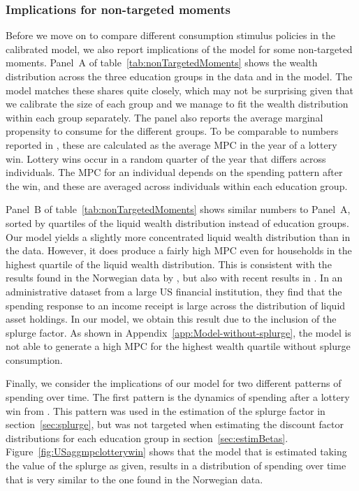 \documentclass[\PathToRoot/\ProjectName]{subfiles}
\begin{document}
\subsubsection{Implications for non-targeted moments}\whenintegrated{\label{non-targeted-moments}}
\whenintegrated{\label{sec:nonTargetedMoments}}

Before we move on to compare different consumption stimulus policies in the calibrated model, we also report implications of the model for some non-targeted moments.
Panel~A of table~\ref{tab:nonTargetedMoments} shows the wealth distribution across the three education groups in the data and in the model.
The model matches these shares quite closely, which may not be surprising given that we calibrate the size of each group and we manage to fit the wealth distribution within each group separately.
The panel also reports the average marginal propensity to consume for the different groups.
To be comparable to numbers reported in \cite{fagereng-mpc-2021}, these are calculated as the average MPC in the year of a lottery win.
Lottery wins occur in a random quarter of the year that differs across individuals.
The MPC for an individual depends on the spending pattern after the win, and these are averaged across individuals within each education group.

Panel~B of table~\ref{tab:nonTargetedMoments} shows similar numbers to Panel~A, sorted by quartiles of the liquid wealth distribution instead of education groups.
Our model yields a slightly more concentrated liquid wealth distribution than in the data.
However, it does produce a fairly high MPC even for households in the highest quartile of the liquid wealth distribution.
This is consistent with the results found in the Norwegian data by \cite{fagereng-mpc-2021}, but also with recent results in \cite{graham2024mental}.
In an administrative dataset from a large US financial institution, they find that the spending response to an income receipt is large across the distribution of liquid asset holdings.
In our model, we obtain this result due to the inclusion of the splurge factor.
As shown in Appendix~\ref{app:Model-without-splurge}, the model is not able to generate a high MPC for the highest wealth quartile without splurge consumption.


Finally, we consider the implications of our model for two different patterns of spending over time.
The first pattern is the dynamics of spending after a lottery win from \citeauthor{fagereng-mpc-2021}.
This pattern was used in the estimation of the splurge factor in section~\ref{sec:splurge}, but was not targeted when estimating the discount factor distributions for each education group in section~\ref{sec:estimBetas}.
Figure~\ref{fig:USaggmpclotterywin} shows that the model that is estimated taking the value of the splurge as given, results in a distribution of spending over time that is very similar to the one found in the Norwegian data.
\end{document}
